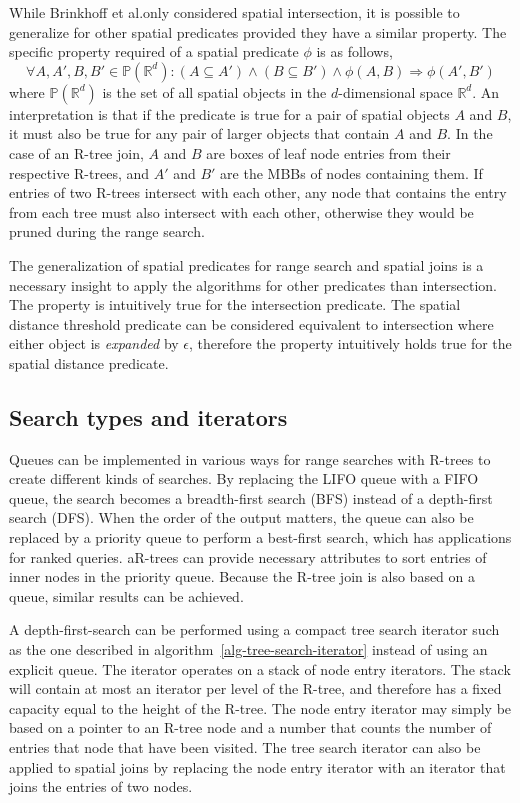 While Brinkhoff et al.\@ only considered spatial intersection, it is possible to generalize for other spatial predicates provided they have a similar property. The specific property required of a spatial predicate \(\phi\) is as follows,
\[
  \forall A, A', B, B' \in \mathbb{P}(\mathbb{R}^d) : (A \subseteq A') \wedge (B \subseteq B') \wedge \phi(A, B) \Rightarrow \phi(A', B')
\]
where \(\mathbb{P}(\mathbb{R}^d)\) is the set of all spatial objects in the \(d\)-dimensional space \(\mathbb{R}^d\). An interpretation is that if the predicate is true for a pair of spatial objects \(A\) and \(B\), it must also be true for any pair of larger objects that contain \(A\) and \(B\). In the case of an R-tree join, \(A\) and \(B\) are boxes of leaf node entries from their respective R-trees, and \(A'\) and \(B'\) are the MBBs of nodes containing them. If entries of two R-trees intersect with each other, any node that contains the entry from each tree must also intersect with each other, otherwise they would be pruned during the range search.

The generalization of spatial predicates for range search and spatial joins is a necessary insight to apply the algorithms for other predicates than intersection. The property is intuitively true for the intersection predicate. The spatial distance threshold predicate can be considered equivalent to intersection where either object is \emph{expanded} by \(\epsilon\), therefore the property intuitively holds true for the spatial distance predicate.

\subsection{Search types and iterators}

Queues can be implemented in various ways for range searches with R-trees to create different kinds of searches. By replacing the LIFO queue with a FIFO queue, the search becomes a breadth-first search (BFS) instead of a depth-first search (DFS). When the order of the output matters, the queue can also be replaced by a priority queue to perform a best-first search, which has applications for ranked queries. aR-trees can provide necessary attributes to sort entries of inner nodes in the priority queue. Because the R-tree join is also based on a queue, similar results can be achieved.

A depth-first-search can be performed using a compact tree search iterator such as the one described in algorithm~\ref{alg-tree-search-iterator} instead of using an explicit queue. The iterator operates on a stack of node entry iterators. The stack will contain at most an iterator per level of the R-tree, and therefore has a fixed capacity equal to the height of the R-tree. The node entry iterator may simply be based on a pointer to an R-tree node and a number that counts the number of entries that node that have been visited. The tree search iterator can also be applied to spatial joins by replacing the node entry iterator with an iterator that joins the entries of two nodes.

